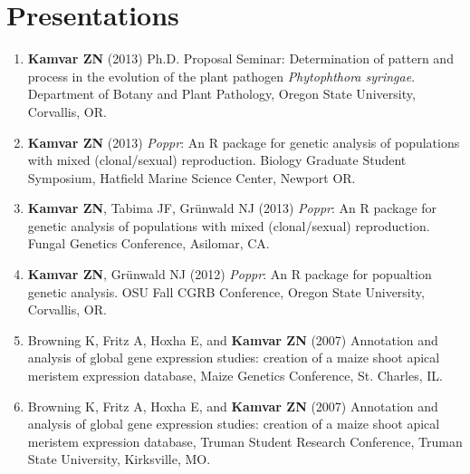 \documentclass[10pt,letterpaper,sans]{modernresume} %
\begin{document}
\section{Presentations}


\begin{enumerate}
	\item \textbf{Kamvar ZN} (2013) Ph.D. Proposal Seminar: Determination of pattern and process in the evolution of the plant pathogen \textit{Phytophthora syringae}. Department of Botany and Plant Pathology, Oregon State University, Corvallis, OR.

	\vspace{6pt}

	\item \textbf{Kamvar ZN} (2013) \textit{Poppr}: An R package for genetic analysis of populations with mixed (clonal/sexual) reproduction. Biology Graduate Student Symposium, Hatfield Marine Science Center, Newport OR.

	\vspace{6pt}

	\item \textbf{Kamvar ZN}, Tabima JF, Gr\"unwald NJ (2013) \textit{Poppr}: An R package for genetic analysis of populations with mixed (clonal/sexual) reproduction. Fungal Genetics Conference, Asilomar, CA.

	\vspace{6pt}

	\item \textbf{Kamvar ZN}, Gr\"unwald NJ (2012) \textit{Poppr}: An R package for popualtion genetic analysis. OSU Fall CGRB Conference, Oregon State University, Corvallis, OR.

	\vspace{6pt}

	\item Browning K, Fritz A, Hoxha E, and \textbf{Kamvar ZN} (2007) Annotation and analysis of global gene expression studies: creation of a maize shoot apical meristem expression database, Maize Genetics Conference, St. Charles, IL.

	\vspace{6pt}

	\item Browning K, Fritz A, Hoxha E, and \textbf{Kamvar ZN} (2007) Annotation and analysis of global gene expression studies: creation of a maize shoot apical meristem expression database, Truman Student Research Conference, Truman State University, Kirksville, MO. 
\end{enumerate}
\end{document}
